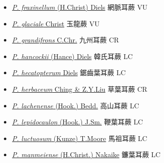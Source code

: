 \begin{itemize}
\begin{itemize}
        \item[] \href{http://www.theplantlist.org/tpl1.1/search?q=Polystichum+fraxinellum}{\textit{P. fraxinellum} (H.Christ) Diels}   網脈耳蕨   VU
        \item[] \href{http://www.theplantlist.org/tpl1.1/search?q=Polystichum+glaciale}{\textit{P. glaciale} Christ}   玉龍蕨   VU
        \item[] \href{http://www.theplantlist.org/tpl1.1/search?q=Polystichum+grandifrons}{\textit{P. grandifrons} C.Chr.}   九州耳蕨   CR
        \item[] \href{http://www.theplantlist.org/tpl1.1/search?q=Polystichum+hancockii}{\textit{P. hancockii} (Hance) Diels}   韓氏耳蕨   LC
        \item[] \href{http://www.theplantlist.org/tpl1.1/search?q=Polystichum+hecatopterum}{\textit{P. hecatopterum} Diels}   鋸齒葉耳蕨   LC
        \item[] \href{http://www.theplantlist.org/tpl1.1/search?q=Polystichum+herbaceum}{\textit{P. herbaceum} Ching \& Z.Y.Liu}   草葉耳蕨   CR
        \item[] \href{http://www.theplantlist.org/tpl1.1/search?q=Polystichum+lachenense}{\textit{P. lachenense} (Hook.) Bedd.}   高山耳蕨   LC
        \item[] \href{http://www.theplantlist.org/tpl1.1/search?q=Polystichum+lepidocaulon}{\textit{P. lepidocaulon} (Hook.) J.Sm.}   鞭葉耳蕨   LC
        \item[] \href{http://www.theplantlist.org/tpl1.1/search?q=Polystichum+luctuosum}{\textit{P. luctuosum} (Kunze) T.Moore}   馬祖耳蕨   LC
        \item[] \href{http://www.theplantlist.org/tpl1.1/search?q=Polystichum+manmeiense}{\textit{P. manmeiense} (H.Christ.) Nakaike}   鐮葉耳蕨   LC

\end{itemize}
\end{itemize}
